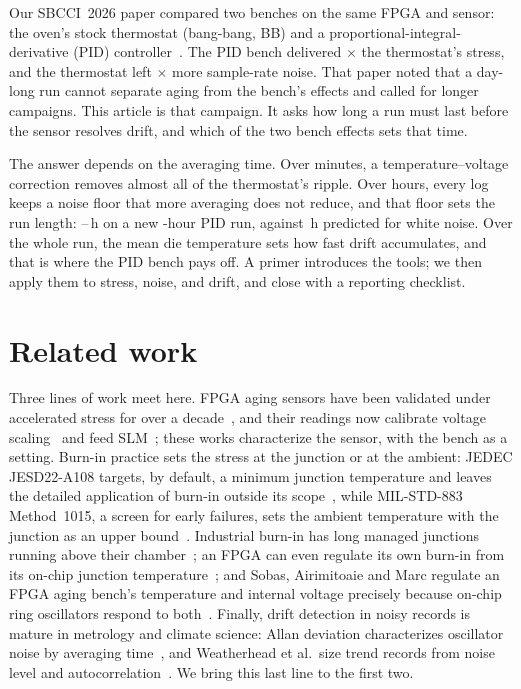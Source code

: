\documentclass[10pt,twocolumn]{article}
\begin{document}
Our SBCCI~2026 paper compared two benches on the same FPGA and sensor: the oven's stock thermostat (bang-bang, BB) and a proportional-integral-derivative (PID) controller~\cite{sbcci26}. The PID bench delivered \vAFratio$\times$ the thermostat's stress, and the thermostat left \vSigRawRatio$\times$ more sample-rate noise. That paper noted that a day-long run cannot separate aging from the bench's effects and called for longer campaigns. This article is that campaign. It asks how long a run must last before the sensor resolves drift, and which of the two bench effects sets that time.

The answer depends on the averaging time. Over minutes, a temperature--voltage correction removes almost all of the thermostat's ripple. Over hours, every log keeps a noise floor that more averaging does not reduce, and that floor sets the run length: \vDetLo--\vDetHi\,h on a new \vDurRCA-hour PID run, against \vTminBound\,h predicted for white noise. Over the whole run, the mean die temperature sets how fast drift accumulates, and that is where the PID bench pays off. A primer introduces the tools; we then apply them to stress, noise, and drift, and close with a reporting checklist.

\section{Related work}

Three lines of work meet here. FPGA aging sensors have been validated under accelerated stress for over a decade~\cite{valdes}, and their readings now calibrate voltage scaling~\cite{niemann} and feed SLM~\cite{kashyap}; these works characterize the sensor, with the bench as a setting. Burn-in practice sets the stress at the junction or at the ambient: JEDEC JESD22-A108 targets, by default, a minimum junction temperature and leaves the detailed application of burn-in outside its scope~\cite{jedec}, while MIL-STD-883 Method~1015, a screen for early failures, sets the ambient temperature with the junction as an upper bound~\cite{mil}. Industrial burn-in has long managed junctions running above their chamber~\cite{vassighi}; an FPGA can even regulate its own burn-in from its on-chip junction temperature~\cite{xilinx}; and Sobas, Airimitoaie and Marc regulate an FPGA aging bench's temperature and internal voltage precisely because on-chip ring oscillators respond to both~\cite{sobas}. Finally, drift detection in noisy records is mature in metrology and climate science: Allan deviation characterizes oscillator noise by averaging time~\cite{allan}, and Weatherhead et al.\ size trend records from noise level and autocorrelation~\cite{weatherhead}. We bring this last line to the first two.
\end{document}
